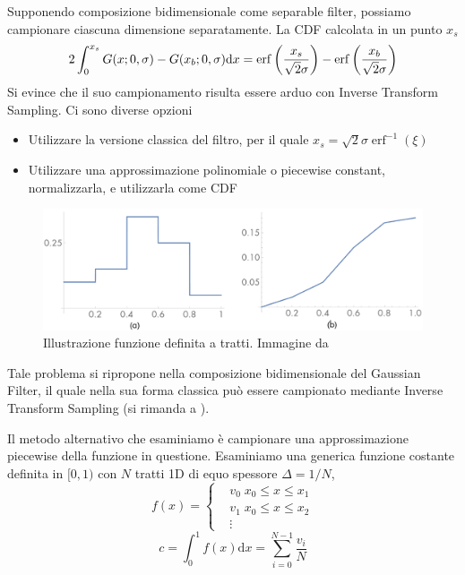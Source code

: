 Supponendo composizione bidimensionale come separable filter, possiamo campionare ciascuna dimensione separatamente. La CDF calcolata in un punto $x_s$
\begin{equation}
	2\int_0^{x_s}G(x;0,\sigma)-G(x_b;0,\sigma)\mathrm{d}x=\operatorname{erf}\left(\frac{x_s}{\sqrt{2}\sigma}\right)-
		\operatorname{erf}\left(\frac{\-x_b}{\sqrt{2}\sigma}\right)
\end{equation}
Si evince che il suo campionamento risulta essere arduo con Inverse Transform Sampling. Ci sono diverse opzioni
\begin{itemize}[topsep=0pt,noitemsep]
	\item Utilizzare la versione classica del filtro, per il quale $x_s=\sqrt{2}\sigma\operatorname{erf}^{-1}(\xi)$ \cite{pegoraro}
	\item Utilizzare una approssimazione polinomiale o piecewise constant, normalizzarla, e utilizzarla come CDF \cite{pharr}
\end{itemize}
\begin{figure}[tb]
	\centering 
	\includegraphics[width=0.8\linewidth]{../assets/chapter5_reconstruction_piecewise.png}
	\caption{Illustrazione funzione definita a tratti. Immagine da \cite{pharr}}
	\label{chapter5:reconstruction:piecewisePDF}
\end{figure}
Tale problema si ripropone nella composizione bidimensionale del Gaussian Filter, il quale nella sua forma classica pu\`o essere campionato mediante 
Inverse Transform Sampling (si rimanda a \cite{pegoraro}).\par
Il metodo alternativo che esaminiamo \`e campionare una approssimazione piecewise della funzione in questione. Esaminiamo una generica funzione 
costante definita in $[0,1)$ con $N$ tratti 1D di equo spessore $\Delta=1/N$, 
\begin{equation}
	f(x)=\left\{\begin{aligned}
		&v_0\;x_0\leq x\leq x_1\\
		&v_1\;x_0\leq x\leq x_2\\
		&\vdots
	\end{aligned}\right.
\end{equation}
\begin{equation}
	c=\int_0^1 f(x)\mathrm{d}x=\sum_{i=0}^{N-1}\frac{v_i}{N}
\end{equation}
